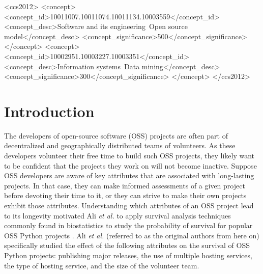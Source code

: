 \documentclass[sigconf]{acmart}
\begin{document}
\begin{CCSXML}
<ccs2012>
<concept>
<concept_id>10011007.10011074.10011134.10003559</concept_id>
<concept_desc>Software and its engineering~Open source model</concept_desc>
<concept_significance>500</concept_significance>
</concept>
<concept>
<concept_id>10002951.10003227.10003351</concept_id>
<concept_desc>Information systems~Data mining</concept_desc>
<concept_significance>300</concept_significance>
</concept>
</ccs2012>
\end{CCSXML}




\maketitle

\section{Introduction} \label{intro}

The developers of open-source software (OSS) projects are often part of decentralized and geographically distributed teams of volunteers.
As these developers volunteer their free time to build such OSS projects, they likely want to be confident that the projects they work on will not become inactive.
Suppose OSS developers are aware of key attributes that are associated with long-lasting projects.
In that case, they can make informed assessments of a given project before devoting their time to it, or they can strive to make their own projects exhibit those attributes.
Understanding which attributes of an OSS project lead to its longevity motivated Ali \emph{et al.} to apply survival analysis techniques commonly found in biostatistics to study the probability of survival for popular OSS Python projects \cite{ali2020cheating}.
Ali \emph{et al.} (referred to as the original authors from here on) specifically studied the effect of the following attributes on the survival of OSS Python projects: publishing major releases, the use of multiple hosting services, the type of hosting service, and the size of the volunteer team.
\end{document}
